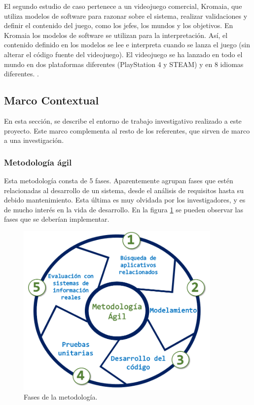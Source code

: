 \documentclass[12pt,a4paper,final]{article}
\begin{document}
	El segundo estudio de caso pertenece a un videojuego comercial, Kromaia, que utiliza modelos de software para razonar sobre el sistema, realizar validaciones y definir el contenido del juego, como los jefes, los mundos y los objetivos. En Kromaia los modelos de software se utilizan para la interpretación. Así, el contenido definido en los modelos se lee e interpreta cuando se lanza el juego (sin alterar el código fuente del videojuego). El videojuego se ha lanzado en todo el mundo en dos plataformas diferentes (PlayStation 4 y STEAM) y en 8 idiomas diferentes. \cite{Topic}.
	
	\subsection{Marco Contextual}
	
	En esta sección, se describe el entorno de trabajo investigativo realizado a este proyecto. Este marco complementa al resto de los referentes, que sirven de marco a una investigación.
		
	\subsubsection{Metodología ágil}
	
	Esta metodología consta de 5 fases. Aparentemente agrupan fases que estén relacionadas al desarrollo de un sistema, desde el análisis de requisitos hasta su debido mantenimiento. Esta última es muy olvidada por los investigadores, y es de mucho interés en la vida de desarrollo. En la figura \ref{fig:metod} se pueden observar las fases que se deberían implementar.
	
	\begin{figure}[h!]
		\centering
		\includegraphics[width=10cm]{images/metodologia.png}
		\caption{Fases de la metodología.}
		\label{fig:metod}
	\end{figure}
	
\end{document}
